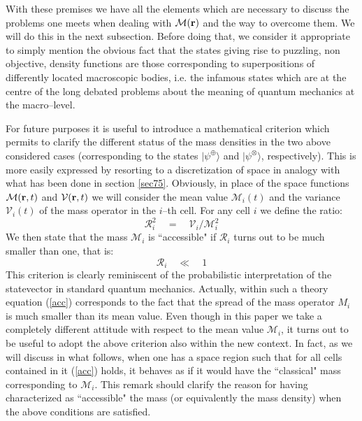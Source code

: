 \documentclass[10pt,a4paper]{article}
\begin{document}
With these premises we have all the elements which are necessary
to discuss the problems one meets when dealing with ${\mathcal
M}({\bf r})$ and the way to overcome them. We will do this in the
next subsection. Before doing that, we consider it appropriate to
simply mention the obvious fact that the states giving rise to
puzzling, non objective, density functions are those corresponding
to superpositions of differently located macroscopic bodies, i.e.
the infamous states which are at the centre of the long debated
problems about the meaning of quantum mechanics at the
macro--level.

For future purposes it is useful to introduce a mathematical
criterion which permits  to clarify  the different status of
the mass densities in the two above considered cases
(corresponding to the states $|\psi^{\oplus}\rangle$  and
$|\psi^{\otimes}\rangle$, respectively). This is more easily
expressed by resorting to a discretization of space in analogy
with what has been done in section \ref{sec75}. Obviously, in
place of the space functions ${\mathcal M}({\bf r}, t)$ and
${\mathcal V}({\bf r}, t)$ we will consider the mean value
${\mathcal M}_{i}(t)$ and the variance ${\mathcal V}_{i}(t)$ of
the mass operator in the $i$--th cell. For any cell $i$ we define
the ratio:
\begin{equation}
{\mathcal R}_{i}^{2} \quad = \quad {\mathcal V}_{i} / {\mathcal
M}_{i}^{2}
\end{equation}
We then state that the mass ${\mathcal M}_{i}$ is ``accessible" if
${\mathcal R}_{i}$ turns out to be much smaller than one, that is:
\begin{equation} \label{acc}
{\mathcal R}_{i} \quad \ll \quad 1
\end{equation}
This criterion is clearly reminiscent of the probabilistic
interpretation of the statevector in standard quantum mechanics.
Actually, within such a theory equation (\ref{acc}) corresponds to
the fact that the spread of the mass operator $M_{i}$ is much
smaller than its mean value. Even though in this paper we take a
completely different attitude with respect to the mean value
${\mathcal M}_{i}$, it turns out to be useful to adopt the above
criterion also within the new context. In fact, as we will discuss
in what follows, when one has a space region such that for all
cells contained in it (\ref{acc}) holds, it behaves as if it would
have the ``classical" mass corresponding to ${\mathcal M}_{i}$. This
remark should clarify the reason for having characterized as
``accessible" the mass (or equivalently the mass density) when the above
conditions are satisfied.
\end{document}
